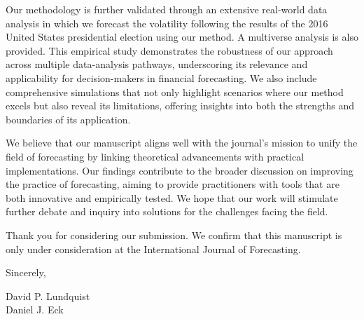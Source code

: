 \documentclass[11pt]{article}
\begin{document}

Our methodology is further validated through an extensive real-world data analysis in which we forecast the volatility following the results of the 2016 United States presidential election using our method. A multiverse analysis is also provided. This empirical study demonstrates the robustness of our approach across multiple data-analysis pathways, underscoring its relevance and applicability for decision-makers in financial forecasting. We also include comprehensive simulations that not only highlight scenarios where our method excels but also reveal its limitations, offering insights into both the strengths and boundaries of its application.

We believe that our manuscript aligns well with the journal's mission to unify the field of forecasting by linking theoretical advancements with practical implementations. Our findings contribute to the broader discussion on improving the practice of forecasting, aiming to provide practitioners with tools that are both innovative and empirically tested. We hope that our work will stimulate further debate and inquiry into solutions for the challenges facing the field.

Thank you for considering our submission. We confirm that this manuscript is only under consideration at the International Journal of Forecasting. 

Sincerely,

David P. Lundquist \\
Daniel J. Eck 
\end{document}
